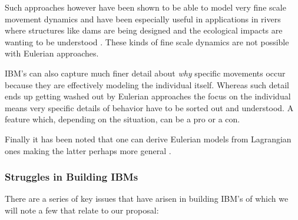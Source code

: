 \documentclass[11pt]{article}
\begin{document}
Such approaches however have been shown to be able to model very fine scale movement dynamics and have been especially useful in applications in rivers where structures like dams are being designed and the ecological impacts are wanting to be understood \cite{goodwin2006} \cite{grimm}. These kinds of fine scale dynamics are not possible with Eulerian approaches. 

IBM's can also capture much finer detail about \textit{why} specific movements occur because they are effectively modeling the individual itself. Whereas such detail ends up getting washed out by Eulerian approaches the focus on the individual means very specific details of behavior have to be sorted out and understood. A feature which, depending on the situation, can be a pro or a con. 

Finally it has been noted that one can derive Eulerian models from Lagrangian ones making the latter perhaps more general \cite{phillipsa2018}. \newline

\subsubsection{Struggles in Building IBMs}

There are a series of key issues \cite{grimm} that have arisen in building IBM's of which we will note a few that relate to our proposal:
\end{document}
